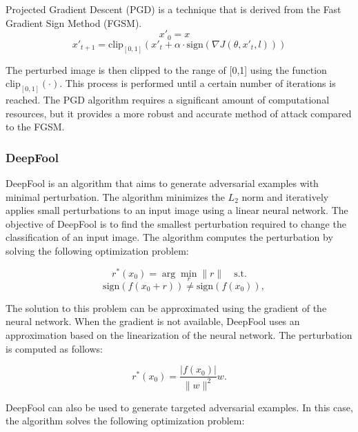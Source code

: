 \documentclass[10pt, conference, a4paper, final]{IEEEtran}
\begin{document}
Projected Gradient Descent (PGD) is a technique that is derived from the Fast Gradient Sign Method (FGSM).
\begin{equation}
    x'_0 = x \quad 
    \end{equation}
    \begin{equation}
    x'_{t+1} = \text{clip}_{[0,1]} \left( x'_t + \alpha \cdot \text{sign}(\nabla J(\theta, x'_t, l)) \right)
    \end{equation}

The perturbed image is then clipped to the range of [0,1] using the function \(\text{clip}_{[0,1]}(\cdot)\). This process is performed until a certain number of iterations is reached. The PGD algorithm requires a significant amount of computational resources, but it provides a more robust and accurate method of attack compared to the FGSM.


\subsubsection{DeepFool}

DeepFool \cite {Moosavi} is an algorithm that aims to generate adversarial examples with minimal perturbation. The algorithm minimizes the \(L_2\) norm and iteratively applies small perturbations to an input image using a linear neural network. The objective of DeepFool is to find the smallest perturbation required to change the classification of an input image. The algorithm computes the perturbation by solving the following optimization problem:

\begin{equation}
r^*(x_0) = \arg\min_r \|r\| \quad \text{s.t.}
\end{equation}
\begin{equation} 
\quad \text{sign}(f(x_0 + r)) \neq \text{sign}(f(x_0)),
\end{equation}

The solution to this problem can be approximated using the gradient of the neural network. When the gradient is not available, DeepFool uses an approximation based on the linearization of the neural network. The perturbation is computed as follows:

\begin{equation}
r^*(x_0) = \frac{|f(x_0)|}{\|w\|^2} w.
\end{equation}

DeepFool can also be used to generate targeted adversarial examples. In this case, the algorithm solves the following optimization problem:
\end{document}
